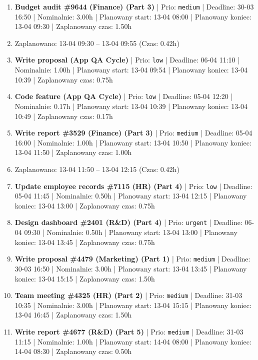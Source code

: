{\begin{enumerate}
  \item [\textbf{14659}] \textbf{Budget audit \#9644 (Finance) (Part 3)} | Prio: \texttt{medium} | Deadline: 30-03 16:50 | Nominalnie: 3.00h | Planowany start: 13-04 08:00 | Planowany koniec: 13-04 09:30 | Zaplanowany czas: 1.50h
  \item [\textbf{PRZERWA}] Zaplanowano: 13-04 09:30 -- 13-04 09:55 (Czas: 0.42h)
  \item [\textbf{14695}] \textbf{Write proposal (App QA Cycle)} | Prio: \texttt{low} | Deadline: 06-04 11:10 | Nominalnie: 1.00h | Planowany start: 13-04 09:54 | Planowany koniec: 13-04 10:39 | Zaplanowany czas: 0.75h
  \item [\textbf{14703}] \textbf{Code feature (App QA Cycle)} | Prio: \texttt{low} | Deadline: 05-04 12:20 | Nominalnie: 0.17h | Planowany start: 13-04 10:39 | Planowany koniec: 13-04 10:49 | Zaplanowany czas: 0.17h
  \item [\textbf{14672}] \textbf{Write report \#3529 (Finance) (Part 3)} | Prio: \texttt{medium} | Deadline: 05-04 16:00 | Nominalnie: 1.00h | Planowany start: 13-04 10:50 | Planowany koniec: 13-04 11:50 | Zaplanowany czas: 1.00h
  \item [\textbf{PRZERWA}] Zaplanowano: 13-04 11:50 -- 13-04 12:15 (Czas: 0.42h)
  \item [\textbf{14701}] \textbf{Update employee records \#7115 (HR) (Part 4)} | Prio: \texttt{low} | Deadline: 05-04 11:45 | Nominalnie: 0.50h | Planowany start: 13-04 12:15 | Planowany koniec: 13-04 13:00 | Zaplanowany czas: 0.75h
  \item [\textbf{14603}] \textbf{Design dashboard \#2401 (R\&D) (Part 4)} | Prio: \texttt{urgent} | Deadline: 06-04 09:30 | Nominalnie: 0.50h | Planowany start: 13-04 13:00 | Planowany koniec: 13-04 13:45 | Zaplanowany czas: 0.75h
  \item [\textbf{14660}] \textbf{Write proposal \#4479 (Marketing) (Part 1)} | Prio: \texttt{medium} | Deadline: 30-03 16:50 | Nominalnie: 3.00h | Planowany start: 13-04 13:45 | Planowany koniec: 13-04 15:15 | Zaplanowany czas: 1.50h
  \item [\textbf{14641}] \textbf{Team meeting \#4325 (HR) (Part 2)} | Prio: \texttt{medium} | Deadline: 31-03 10:35 | Nominalnie: 3.00h | Planowany start: 13-04 15:15 | Planowany koniec: 13-04 16:45 | Zaplanowany czas: 1.50h
  \item [\textbf{14640}] \textbf{Write report \#4677 (R\&D) (Part 5)} | Prio: \texttt{medium} | Deadline: 31-03 11:15 | Nominalnie: 1.00h | Planowany start: 14-04 08:00 | Planowany koniec: 14-04 08:30 | Zaplanowany czas: 0.50h

\end{enumerate}}
